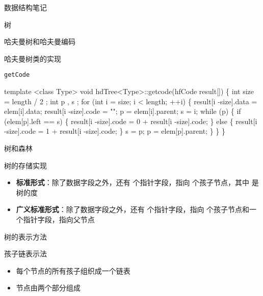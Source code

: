 \documentclass[
  ignorenonframetext,
]{beamer}
\newenvironment{Shaded}{}{}
\newcommand{\NormalTok}[1]{#1}
\providecommand{\tightlist}{%
  \setlength{\itemsep}{0pt}\setlength{\parskip}{0pt}}
\begin{document}
\begin{frame}[fragile]{数据结构笔记}
\begin{block}{树}
\begin{block}{哈夫曼树和哈夫曼编码}
\begin{block}{哈夫曼树类的实现}
\begin{block}{\texttt{getCode}}
\protect{}\label{getcode}
\begin{Shaded}
\begin{Highlighting}[]
\NormalTok{template \textless{}class Type\textgreater{}}
\NormalTok{void hdTree\textless{}Type\textgreater{}::getcode(hfCode result[])}
\NormalTok{\{}
\NormalTok{  int size = length / 2 ; }
\NormalTok{  int p , s ;}
\NormalTok{  for (int i = size; i \textless{} length; ++i)}
\NormalTok{  \{}
\NormalTok{    result[i {-}size].data = elem[i].data;}
\NormalTok{    result[i {-}size].code = "";}
\NormalTok{    p = elem[i].parent; s = i;}
\NormalTok{    while (p)}
\NormalTok{    \{}
\NormalTok{      if (elem[p].left == s)}
\NormalTok{      \{}
\NormalTok{        result[i {-}size].code = \textquotesingle{}0\textquotesingle{} + result[i {-}size].code;}
\NormalTok{      \}}
\NormalTok{      else}
\NormalTok{      \{}
\NormalTok{        result[i {-}size].code = \textquotesingle{}1\textquotesingle{} + result[i {-}size].code;}
\NormalTok{      \}}
\NormalTok{      s = p;}
\NormalTok{      p = elem[p].parent;}
\NormalTok{    \}}
\NormalTok{  \}}
\NormalTok{\}}
\end{Highlighting}
\end{Shaded}
\end{block}
\end{block}
\end{block}

\begin{block}{树和森林}
\protect{}\label{ux6811ux548cux68eeux6797}
\begin{block}{树的存储实现}
\protect{}\label{ux6811ux7684ux5b58ux50a8ux5b9eux73b0}
\begin{itemize}
\tightlist
\item
  \textbf{标准形式}：除了数据字段之外，还有 {} 个指针字段，指向 {}
  个孩子节点，其中 {} 是树的度
\item
  \textbf{广义标准形式}：除了数据字段之外，还有 {} 个指针字段，指向 {}
  个孩子节点和一个指针字段，指向父节点
\end{itemize}

\end{block}

\begin{block}{树的表示方法}
\protect{}\label{ux6811ux7684ux8868ux793aux65b9ux6cd5}
\begin{block}{孩子链表示法}
\protect{}\label{ux5b69ux5b50ux94feux8868ux793aux6cd5}
\begin{itemize}
\item
  每个节点的所有孩子组织成一个链表
\item
  节点由两个部分组成


\end{itemize}
\end{block}
\end{block}
\end{block}
\end{block}
\end{frame}
\end{document}

